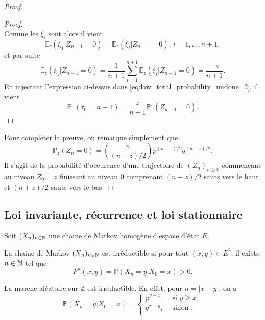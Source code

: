 \begin{proof}
\begin{proof}
$$$$
Comme les $\xi_i$ sont \iid alors il vient 
$$
\mathbb{E}_z(\xi_1|Z_{n+1}=0) = \mathbb{E}_z(\xi_i|Z_{n+1}=0)\text{, } i = 1, \ldots, n+1,
$$
et par suite 
$$
\mathbb{E}_z(\xi_1|Z_{n+1}=0) = \frac{1}{n+1}\sum_{i =1}^{n+1}\mathbb{E}_z(\xi_i|Z_{n+1}=0) = \frac{-z}{n+1}.
$$
En injectant l'expression ci-dessus dans \eqref{eq:law_total_probability_undone_2}, il vient 
$$
\mathbb{P}_z(\tau_0 = n+1) = \frac{z}{n+1}\mathbb{P}_z(Z_{n+1} = 0).
$$
\end{proof}
Pour compléter la preuve, on remarque simplement que
$$
\mathbb{P}_z(Z_n = 0) = \binom{n}{(n-z) / 2}p^{(n-z) / 2}q^{(n
+z) / 2}.
$$
Il s'agit de la probabilité d'occurence d'une trajectoire de $(Z_n)_{n \geq0}$ commençant au niveau $Z_0 = z$ finissant au niveau $0$ comprenant $(n-z)/2$ sauts vers le haut et $(n+z)/2$ sauts vers le bas.
\end{proof}

\subsection{Loi invariante, récurrence et loi stationnaire}
Soit $(X_{n})_{n\in\mathbb{N}}$ une chaine de Markov homogène d'espace d'état $E$.
\begin{definition}[Irréductibilité]
La chaine de Markov $(X_n)_{n\in\mathbb{N}}$ est irréductible si pour tout $(x,y)\in E^{2}$, il existe $n\in\mathbb{N}$ tel que
$$P^{n}(x,y)=\mathbb{P}(X_n=y|X_0=x)>0.$$
\end{definition}
\begin{ex}
La marche aléatoire sur $\mathbb{Z}$ est irréductible. En effet, pour $n = |x-y|$, on a 
$$
\mathbb{P}(X_n=y|X_0=x) = \begin{cases}
p^{y-x},&\text{ si } y\geq x,\\
q^{x-y},&\text{ sinon }.\\
\end{cases}
$$
\end{ex}

